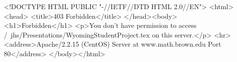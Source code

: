 <!DOCTYPE HTML PUBLIC "-//IETF//DTD HTML 2.0//EN">
<html><head>
<title>403 Forbidden</title>
</head><body>
<h1>Forbidden</h1>
<p>You don't have permission to access /~jhs/Presentations/WyomingStudentProject.tex
on this server.</p>
<hr>
<address>Apache/2.2.15 (CentOS) Server at www.math.brown.edu Port 80</address>
</body></html>
